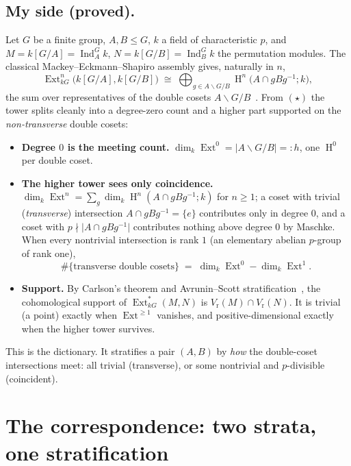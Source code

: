 \documentclass[11pt]{amsart}
\theoremstyle{plain}
\theoremstyle{definition}
\DeclareMathOperator{\Ind}{Ind}
\DeclareMathOperator{\Ext}{Ext}
\DeclareMathOperator{\Hh}{H}
\newcommand{\kk}{k}
\newcommand{\dcoset}[3]{#1\backslash #2/#3}
\newcommand{\Vr}{V_{\mathrm{r}}}
\begin{document}
\subsection{My side (proved).}
Let $G$ be a finite group, $A,B\le G$, $k$ a field of characteristic $p$, and
$M=\kk[G/A]=\Ind_A^G k$, $N=\kk[G/B]=\Ind_B^G k$ the permutation modules. The classical
Mackey--Eckmann--Shapiro assembly gives, naturally in $n$,
\begin{equation}\label{eq:star}
  \Ext^n_{kG}\big(\kk[G/A],\kk[G/B]\big)\;\cong\;
    \bigoplus_{g\in\dcoset{A}{G}{B}} \Hh^n\!\big(A\cap gBg^{-1};k\big),
  \tag{$\star$}
\end{equation}
the sum over representatives of the double cosets $\dcoset{A}{G}{B}$~\cite{macbeth-ext}. From
$(\star)$ the tower splits cleanly into a degree-zero count and a higher part
supported on the \emph{non-transverse} double cosets:
\begin{itemize}
  \item \textbf{Degree $0$ is the meeting count.}
    $\dim_k\Ext^0=\lvert\dcoset{A}{G}{B}\rvert=:h$, one $\Hh^0$ per double coset.
  \item \textbf{The higher tower sees only coincidence.}
    $\dim_k\Ext^n=\sum_g\dim_k\Hh^n(A\cap gBg^{-1};k)$ for $n\ge1$; a coset with trivial
    (\emph{transverse}) intersection $A\cap gBg^{-1}=\{e\}$ contributes only in degree $0$,
    and a coset with $p\nmid\lvert A\cap gBg^{-1}\rvert$ contributes nothing above degree $0$
    by Maschke. When every nontrivial intersection is rank $1$ (an elementary abelian $p$-group
    of rank one),
    \begin{equation}\label{eq:count}
      \#\{\text{transverse double cosets}\}\;=\;\dim_k\Ext^0-\dim_k\Ext^1 .
    \end{equation}
  \item \textbf{Support.} By Carlson's theorem and Avrunin--Scott
    stratification~\cite{carlson-varieties,avrunin-scott,benson2}, the cohomological support
    of $\Ext^{*}_{kG}(M,N)$ is $\Vr(M)\cap\Vr(N)$. It is trivial (a point) exactly when
    $\Ext^{\ge1}$ vanishes, and positive-dimensional exactly when the higher tower survives.
\end{itemize}
This is the dictionary. It stratifies a pair $(A,B)$ by \emph{how} the double-coset
intersections meet: all trivial (transverse), or some nontrivial and $p$-divisible
(coincident).

\section{The correspondence: two strata, one stratification}
\end{document}
